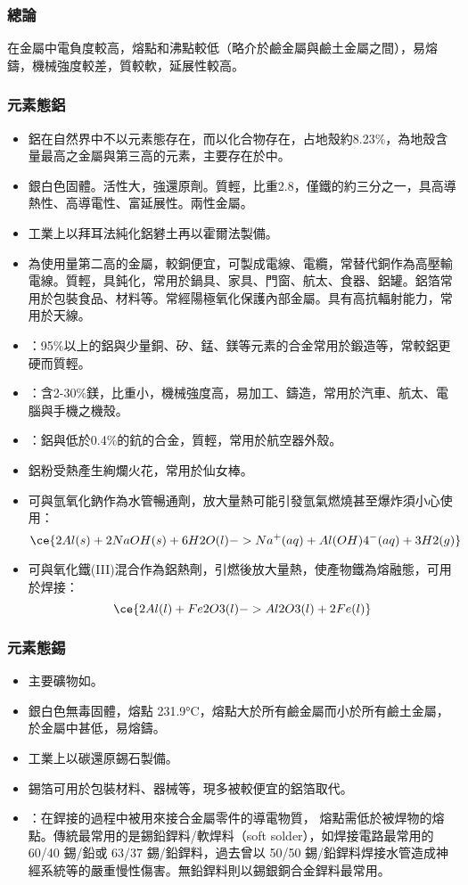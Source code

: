 \documentclass[a4paper,12pt]{report}
\begin{document}
\begin{itemize}
\begin{itemize}
\subsubsection{總論}
在金屬中電負度較高，熔點和沸點較低（略介於鹼金屬與鹼土金屬之間），易熔鑄，機械強度較差，質較軟，延展性較高。
\subsubsection{元素態鋁}
\begin{itemize}
\item 鋁在自然界中不以元素態存在，而以化合物存在，占地殼約8.23\%，為地殼含量最高之金屬與第三高的元素，主要存在於中。
\item 銀白色固體。活性大，強還原劑。質輕，比重2.8，僅鐵的約三分之一，具高導熱性、高導電性、富延展性。兩性金屬。
\item 工業上以拜耳法純化鋁礬土再以霍爾法製備。
\item 為使用量第二高的金屬，較銅便宜，可製成電線、電纜，常替代銅作為高壓輸電線。質輕，具鈍化，常用於鍋具、家具、門窗、航太、食器、鋁罐。鋁箔常用於包裝食品、材料等。常經陽極氧化保護內部金屬。具有高抗輻射能力，常用於天線。
\item {}：95\%以上的鋁與少量銅、矽、錳、鎂等元素的合金常用於鍛造等，常較鋁更硬而質輕。
\item {}：含2-30\%鎂，比重小，機械強度高，易加工、鑄造，常用於汽車、航太、電腦與手機之機殼。
\item {}：鋁與低於0.4\%的鈧的合金，質輕，常用於航空器外殼。
\item 鋁粉受熱產生絢爛火花，常用於仙女棒。
\item 可與氫氧化鈉作為水管暢通劑，放大量熱可能引發氫氣燃燒甚至爆炸須小心使用：
\[\ce{2Al(s) + 2NaOH(s) + 6H2O(l) -> Na^+(aq) + Al(OH)4^-(aq) + 3H2(g)}\]
\item 可與氧化鐵(III)混合作為鋁熱劑，引燃後放大量熱，使產物鐵為熔融態，可用於焊接：
\[\ce{2Al(l) + Fe2O3(l) -> Al2O3(l) + 2Fe(l)}\]
\end{itemize}
\subsubsection{元素態錫}
\begin{itemize}
\item 主要礦物如。
\item 銀白色無毒固體，熔點 231.9°C，熔點大於所有鹼金屬而小於所有鹼土金屬，於金屬中甚低，易熔鑄。
\item 工業上以碳還原錫石製備。
\item 錫箔可用於包裝材料、器械等，現多被較便宜的鋁箔取代。
\item {}：在銲接的過程中被用來接合金屬零件的導電物質， 熔點需低於被焊物的熔點。傳統最常用的是錫鉛銲料/軟焊料（soft solder），如焊接電路最常用的 60/40 錫/鉛或 63/37 錫/鉛銲料，過去曾以 50/50 錫/鉛銲料焊接水管造成神經系統等的嚴重慢性傷害。無鉛銲料則以錫銀銅合金銲料最常用。
\end{itemize}

\end{itemize}
\end{itemize}
\end{document}
